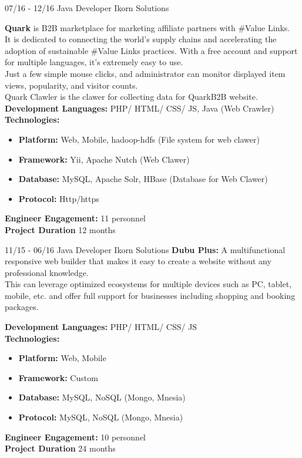 \documentclass[]{friggeri-cv}
\begin{document}
\begin{entrylist}
\entry
    {07/16 - 12/16}
    {Java Developer}
    {Ikorn Solutions}
	{\textbf{Quark}  is B2B marketplace for marketing affiliate partners with \#Value Links.\\ 
	It is dedicated to connecting the world’s supply chains and accelerating the adoption of sustainable \#Value Links practices.
	With a free account and support for multiple languages, it’s extremely easy to use.\\
	 Just a few simple mouse clicks, and administrator can monitor displayed item views, popularity, and visitor counts.\\
	Quark Clawler is the clawer for collecting data  for QuarkB2B website.\\

	 \textbf{Development Languages:} PHP/ HTML/ CSS/ JS, Java (Web Crawler) \\ 
	 \textbf{Technologies:}~
			\begin{itemize}
				\item \textbf{Platform:} Web,  Mobile, hadoop-hdfs (File system for web clawer)
				\item \textbf{Framework:} Yii, Apache Nutch (Web Clawer)
				\item \textbf{Database:} MySQL, Apache Solr, HBase (Database for Web Clawer)
				\item \textbf{Protocol:} Http/https
			\end{itemize}
		 \textbf{Engineer Engagement:} 11 personnel\\
		 \textbf{Project Duration} 12  months~
	}
\end{entrylist}

\begin{entrylist}
\entry
    {11/15 - 06/16}
    {Java Developer}
    {Ikorn Solutions}
	{\textbf{Dubu Plus: } A multifunctional responsive web builder that makes it easy to create a website without any professional knowledge.
	\\ This can leverage optimized ecosystems for multiple devices such as PC, tablet, mobile, etc. and offer full support for businesses including shopping and booking packages.\\
}
\end{entrylist}

\begin{entrylist}
\entry
{}
{}
{}
{
		 \textbf{Development Languages:} PHP/ HTML/ CSS/ JS~\\
		 \textbf{Technologies:}~
			\begin{itemize}
				\item \textbf{Platform:} Web,  Mobile
				\item \textbf{Framework:} Custom
				\item \textbf{Database:} MySQL, NoSQL (Mongo, Mnesia)
				\item \textbf{Protocol:} MySQL, NoSQL (Mongo, Mnesia)
			\end{itemize}
		 \textbf{Engineer Engagement:} 10 personnel\\
		 \textbf{Project Duration} 24  months\\
	}
\end{entrylist}
\end{document}
